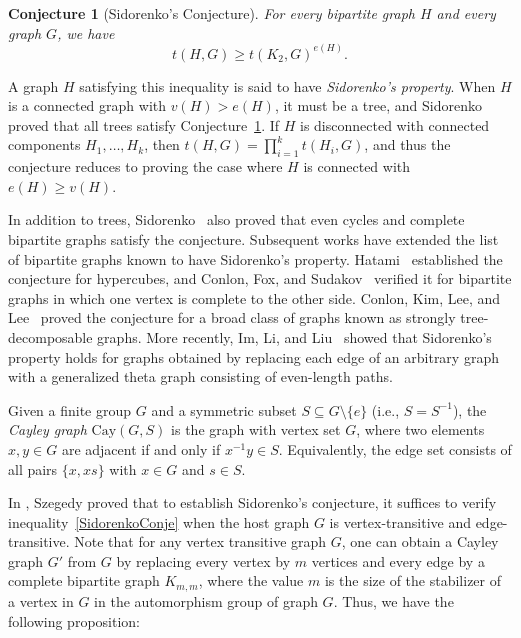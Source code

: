 \documentclass[12pt,a4paper]{article}
\newtheorem{conjecture}[theorem]{Conjecture}
\theoremstyle{definition}
\theoremstyle{plain}
\theoremstyle{definition}
\begin{document}
\begin{conjecture}[Sidorenko's Conjecture]\label{SidorenkoConj}
For every bipartite graph $H$ and every graph $G$, we have 
    \begin{equation}\label{SidorenkoConje}
        t(H,G)\geq t(K_2,G)^{e(H)}.
    \end{equation}    
\end{conjecture}

A graph $H$ satisfying this inequality is said to have \emph{Sidorenko's property}. When $H$ is a connected graph with $v(H) > e(H)$, it must be a tree, and Sidorenko~\cite{sidorenko1993correlation} proved that all trees satisfy Conjecture~\ref{SidorenkoConj}. If $H$ is disconnected with connected components $H_1, \dots, H_k$, then $t(H, G) = \prod_{i=1}^{k} t(H_i, G)$, and thus the conjecture reduces to proving the case where $H$ is connected with $e(H) \geq v(H)$.

In addition to trees, Sidorenko~\cite{sidorenko1993correlation} also proved that even cycles and complete bipartite graphs satisfy the conjecture. Subsequent works have extended the list of bipartite graphs known to have Sidorenko's property. Hatami~\cite{hatami2010graph} established the conjecture for hypercubes, and Conlon, Fox, and Sudakov~\cite{conlon2010approximate} verified it for bipartite graphs in which one vertex is complete to the other side. Conlon, Kim, Lee, and Lee~\cite{conlon2018some} proved the conjecture for a broad class of graphs known as strongly tree-decomposable graphs. More recently, Im, Li, and Liu~\cite{im2024sidorenko} showed that Sidorenko's property holds for graphs obtained by replacing each edge of an arbitrary graph with a generalized theta graph consisting of even-length paths.


Given a finite group $G$ and a symmetric subset $S \subseteq G \setminus \{e\}$ (i.e., $S = S^{-1}$), the \emph{Cayley graph} $\mathrm{Cay}(G, S)$ is the graph with vertex set $G$, where two elements $x, y \in G$ are adjacent if and only if $x^{-1}y \in S$. Equivalently, the edge set consists of all pairs $\{x, xs\}$ with $x \in G$ and $s \in S$.

In \cite{szegedy2015sparse}, Szegedy proved that to establish Sidorenko's conjecture, it suffices to verify inequality~\eqref{SidorenkoConje} when the host graph $G$ is vertex-transitive and edge-transitive. Note that \cite{lovasz2015automorphism} for any vertex transitive graph $G$, one can obtain a Cayley graph $G'$ from $G$ by replacing every vertex by $m$ vertices and every edge by a complete bipartite graph $K_{m,m}$, where the value $m$ is the size of the stabilizer of a vertex in $G$ in the automorphism group of graph $G$. Thus, we have the following proposition:
\end{document}
